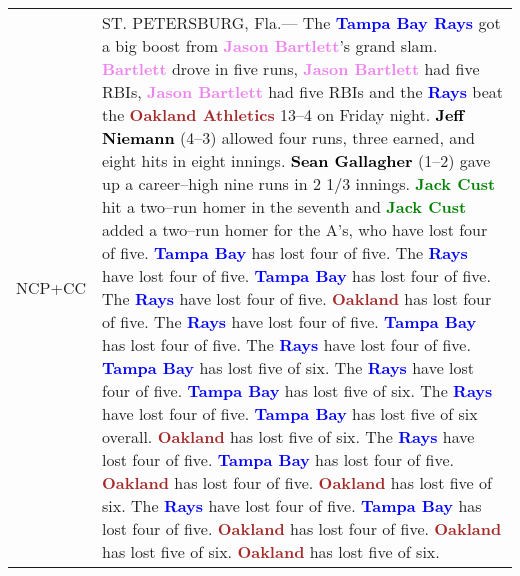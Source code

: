 \documentclass[11pt,a4paper]{article}
\begin{document}
\begin{table*}
\begin{tabular}{|c|p{13.5cm}|}
\\ 
\hline 

NCP+CC & 
ST. PETERSBURG, Fla.--- The \textcolor{blue}{\textbf{Tampa Bay Rays}} got a big boost from \textcolor{violet}{\textbf{Jason Bartlett}}'s grand slam. \textcolor{violet}{\textbf{Bartlett}} drove in five runs, \textcolor{violet}{\textbf{Jason Bartlett}} had five RBIs, \textcolor{violet}{\textbf{Jason Bartlett}} had five RBIs and the \textcolor{blue}{\textbf{Rays}} beat the \textcolor{brown}{\textbf{Oakland Athletics}} 13--4 on Friday night. \textcolor{black}{\textbf{Jeff Niemann}} (4--3) allowed four runs, three earned, and eight hits in eight innings. \textcolor{black}{\textbf{Sean Gallagher}} (1--2) gave up a career--high nine runs in 2 1/3 innings. \textcolor{green}{\textbf{Jack Cust}} hit a two--run homer in the seventh and \textcolor{green}{\textbf{Jack Cust}} added a two--run homer for the A's, who have lost four of five. \textcolor{blue}{\textbf{Tampa Bay}} has lost four of five. The \textcolor{blue}{\textbf{Rays}} have lost four of five. \textcolor{blue}{\textbf{Tampa Bay}} has lost four of five. The \textcolor{blue}{\textbf{Rays}} have lost four of five. \textcolor{brown}{\textbf{Oakland}} has lost four of five. The \textcolor{blue}{\textbf{Rays}} have lost four of five. \textcolor{blue}{\textbf{Tampa Bay}} has lost four of five. The \textcolor{blue}{\textbf{Rays}} have lost four of five. \textcolor{blue}{\textbf{Tampa Bay}} has lost five of six. The \textcolor{blue}{\textbf{Rays}} have lost four of five. \textcolor{blue}{\textbf{Tampa Bay}} has lost five of six. The \textcolor{blue}{\textbf{Rays}} have lost four of five. \textcolor{blue}{\textbf{Tampa Bay}} has lost five of six overall. \textcolor{brown}{\textbf{Oakland}} has lost five of six. The \textcolor{blue}{\textbf{Rays}} have lost four of five. \textcolor{blue}{\textbf{Tampa Bay}} has lost four of five. \textcolor{brown}{\textbf{Oakland}} has lost four of five. \textcolor{brown}{\textbf{Oakland}} has lost five of six. The \textcolor{blue}{\textbf{Rays}} have lost four of five. \textcolor{blue}{\textbf{Tampa Bay}} has lost four of five. \textcolor{brown}{\textbf{Oakland}} has lost four of five. \textcolor{brown}{\textbf{Oakland}} has lost five of six. \textcolor{brown}{\textbf{Oakland}} has lost five of six.


\end{tabular}
\end{table*}
\end{document}
